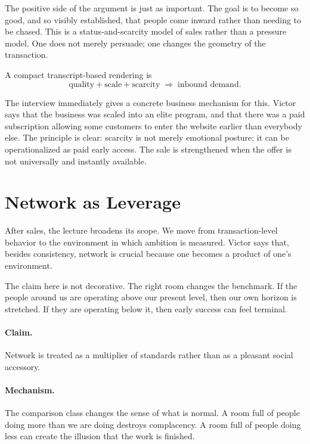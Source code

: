 The positive side of the argument is just as important. The goal is to become so good, and so visibly established, that people come inward rather than needing to be chased. This is a status-and-scarcity model of sales rather than a pressure model. One does not merely persuade; one changes the geometry of the transaction.

A compact transcript-based rendering is
\begin{equation}
\text{quality} + \text{scale} + \text{scarcity} \;\Rightarrow\; \text{inbound demand}.
\end{equation}

The interview immediately gives a concrete business mechanism for this. Victor says that the business was scaled into an elite program, and that there was a paid subscription allowing some customers to enter the website earlier than everybody else. The principle is clear: scarcity is not merely emotional posture; it can be operationalized as paid early access. The sale is strengthened when the offer is not universally and instantly available.

\section{Network as Leverage}

After sales, the lecture broadens its scope. We move from transaction-level behavior to the environment in which ambition is measured. Victor says that, besides consistency, network is crucial because one becomes a product of one's environment.

The claim here is not decorative. The right room changes the benchmark. If the people around us are operating above our present level, then our own horizon is stretched. If they are operating below it, then early success can feel terminal.

\paragraph{Claim.}
Network is treated as a multiplier of standards rather than as a pleasant social accessory.

\paragraph{Mechanism.}
The comparison class changes the sense of what is normal. A room full of people doing more than we are doing destroys complacency. A room full of people doing less can create the illusion that the work is finished.

